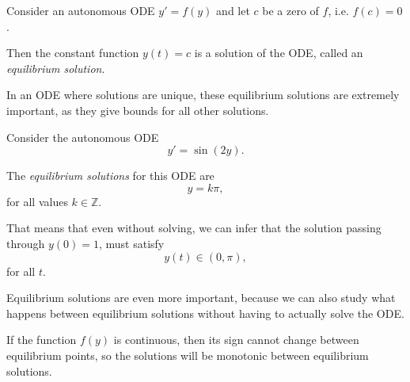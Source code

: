 \begin{important}
Consider an autonomous ODE $y'=f(y)$ and let $c$ be a zero of $f$, i.e. $f(c)=0$.

Then the constant function $y(t) = c$ is a solution of the ODE, called an \emph{equilibrium solution}.
\end{important}


In an ODE where solutions are unique, these equilibrium solutions are extremely important, as they give bounds for all other solutions.


\begin{example}
Consider the autonomous ODE
$$
y'=\sin(2y).
$$

The \emph{equilibrium solutions} for this ODE are
$$
y = k\pi,
$$
for all values $k \in \mathbb{Z}$.

That means that even without solving, we can infer that the solution passing through $y(0)=1$, must satisfy
$$
y(t) \in (0,\pi),
$$
for all $t$.	
\end{example}


Equilibrium solutions are even more important, because we can also study what happens between equilibrium solutions without having to actually solve the ODE.

If the function $f(y)$ is continuous, then its sign cannot change between equilibrium points, so the solutions will be monotonic between equilibrium solutions.

